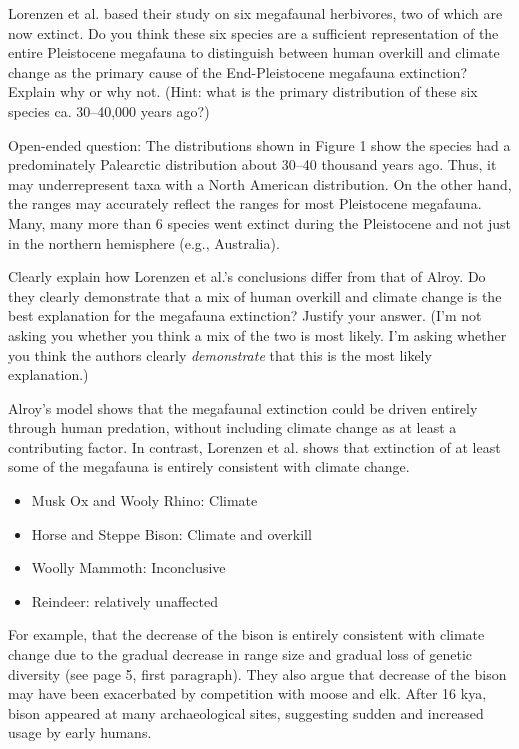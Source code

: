 \documentclass[11pt]{exam}
\begin{document}
\begin{questions}
\question[5]
Lorenzen et al. based their study on six megafaunal herbivores, two
of which are now extinct. Do you think these six species are a
sufficient representation of the entire Pleistocene megafauna to
distinguish between human overkill and climate change as the primary
cause of the End-Pleistocene megafauna extinction? Explain why or why
not. (Hint: what is the primary distribution of these six species ca.
30–40,000 years ago?)

\ifprintanswers
Open-ended question: The distributions shown in Figure 1 show the
species had a predominately Palearctic distribution about 30--40
thousand years ago. Thus, it may underrepresent taxa with a North
American distribution. On the other hand, the ranges may accurately
reflect the ranges for most Pleistocene megafauna. Many, many more than
6 species went extinct during the Pleistocene and not just in the
northern hemisphere (e.g., Australia).
\else
\fi

\question[5]
Clearly explain how Lorenzen et al.'s conclusions differ from that of
Alroy. Do they clearly demonstrate that a mix of human overkill and
climate change is the best explanation for the megafauna extinction?
Justify your answer. (I'm not asking you whether you think a mix of the
two is most likely. I'm asking whether you think the authors clearly
\emph{demonstrate} that this is the most likely explanation.)

\ifprintanswers
Alroy's model shows that the megafaunal extinction could be driven
entirely through human predation, without including climate change as at
least a contributing factor. In contrast, Lorenzen et al. shows that extinction
of at least some of the megafauna is entirely consistent with climate change. 

\begin{itemize}
\item Musk Ox and Wooly Rhino: Climate 

\item Horse and Steppe Bison: Climate and overkill

\item Woolly Mammoth: Inconclusive

\item Reindeer: relatively unaffected
\end{itemize}

For example, that the decrease of the bison is entirely consistent with climate change
due to the gradual decrease in range size and gradual loss of genetic
diversity (see page 5, first paragraph). They also argue that decrease of the
bison may have been exacerbated by competition with moose and elk. After
16 kya, bison appeared at many archaeological sites, suggesting sudden
and increased usage by early humans.


\end{questions}
\end{document}
